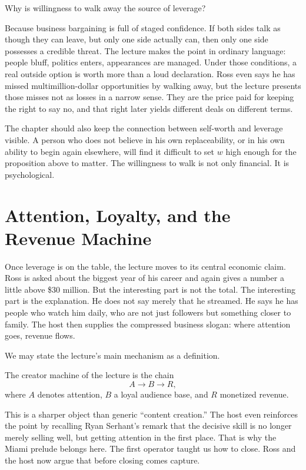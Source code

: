 Why is willingness to walk away the source of leverage?

Because business bargaining is full of staged confidence. If both sides talk as though they can leave, but only one side actually can, then only one side possesses a credible threat. The lecture makes the point in ordinary language: people bluff, politics enters, appearances are managed. Under those conditions, a real outside option is worth more than a loud declaration. Ross even says he has missed multimillion-dollar opportunities by walking away, but the lecture presents those misses not as losses in a narrow sense. They are the price paid for keeping the right to say no, and that right later yields different deals on different terms.

The chapter should also keep the connection between self-worth and leverage visible. A person who does not believe in his own replaceability, or in his own ability to begin again elsewhere, will find it difficult to set \(w\) high enough for the proposition above to matter. The willingness to walk is not only financial. It is psychological.

\section{Attention, Loyalty, and the Revenue Machine}

Once leverage is on the table, the lecture moves to its central economic claim. Ross is asked about the biggest year of his career and again gives a number a little above \$30 million. But the interesting part is not the total. The interesting part is the explanation. He does not say merely that he streamed. He says he has people who watch him daily, who are not just followers but something closer to family. The host then supplies the compressed business slogan: where attention goes, revenue flows.

We may state the lecture's main mechanism as a definition.

\begin{definition}
The creator machine of the lecture is the chain
\begin{equation}
A \to B \to R,
\end{equation}
where \(A\) denotes attention, \(B\) a loyal audience base, and \(R\) monetized revenue.
\end{definition}

This is a sharper object than generic ``content creation.'' The host even reinforces the point by recalling Ryan Serhant's remark that the decisive skill is no longer merely selling well, but getting attention in the first place. That is why the Miami prelude belongs here. The first operator taught us how to close. Ross and the host now argue that before closing comes capture.

